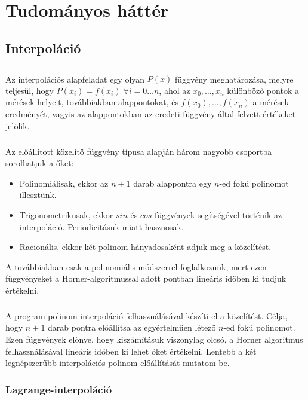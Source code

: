 \documentclass[12pt]{report}
\begin{document}
\chapter{Tudományos háttér}

\section{Interpoláció}
\paragraph{}
Az interpolációs alapfeladat\textsuperscript{\cite{nummod}} egy olyan $P(x)$ függvény meghatározása, melyre teljesül, hogy $P(x_i)=f(x_i) \; \forall i = 0 \dots n$, ahol az $x_0, \dots, x_n$ különböző pontok a mérések helyeit, továbbiakban alappontokat, és $f(x_0), \dots, f(x_n)$ a mérések eredményét, vagyis az alappontokban az eredeti függvény által felvett értékeket jelölik.
\paragraph{}
Az előállított közelítő függvény típusa alapján három nagyobb csoportba sorolhatjuk a őket:
\begin{itemize}
\item Polinomiálisak, ekkor az $n+1$ darab alappontra egy $n$-ed fokú polinomot illesztünk.
\item Trigonometrikusak, ekkor $sin$ és $cos$ függvények segítségével történik az interpoláció. Periodicitásuk miatt hasznosak.
\item Racionális, ekkor két polinom hányadosaként adjuk meg a közelítést.
\end{itemize}
A továbbiakban csak a polinomiális módszerrel foglalkozunk, mert ezen függvényeket a Horner-algoritmussal adott pontban lineáris időben ki tudjuk értékelni.
\paragraph{}
A program polinom interpoláció felhasználásával készíti el a közelítést. Célja, hogy $n+1$ darab pontra előállítsa az egyértelműen létező $n$-ed fokú polinomot. Ezen függvények előnye, hogy kiszámításuk viszonylag olcsó, a Horner algoritmus felhasználásával lineáris időben ki lehet őket értékelni. Lentebb a két legnépszerűbb interpolációs polinom előállítását mutatom be.

\subsection{Lagrange-interpoláció}
\end{document}
